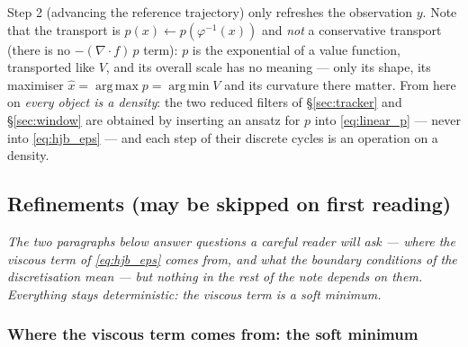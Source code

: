 \documentclass[11pt,a4paper]{article}
\newcommand{\argmin}{\operatorname{arg\,min}}
\newcommand{\argmax}{\operatorname{arg\,max}}
\newcommand{\xh}{\hat{x}}
\newcommand{\grad}{\nabla}
\theoremstyle{plain}
\theoremstyle{definition}
\theoremstyle{remark}
\begin{document}
Step 2 (advancing the reference trajectory) only refreshes the observation $y$. Note that the transport is $p(x)\leftarrow p(\varphi^{-1}(x))$ and \emph{not} a conservative transport (there is no $-(\grad\!\cdot\! f)\,p$ term): $p$ is the exponential of a value function, transported like $V$, and its overall scale has no meaning --- only its shape, its maximiser $\xh=\argmax p=\argmin V$ and its curvature there matter. From here on \emph{every object is a density}: the two reduced filters of \S\ref{sec:tracker} and \S\ref{sec:window} are obtained by inserting an ansatz for $p$ into \eqref{eq:linear_p} --- never into \eqref{eq:hjb_eps} --- and each step of their discrete cycles is an operation on a density.


\subsection{Refinements (may be skipped on first reading)}
\label{sec:refinements}

\emph{The two paragraphs below answer questions a careful reader will ask --- where the viscous term of \eqref{eq:hjb_eps} comes from, and what the boundary conditions of the discretisation mean --- but nothing in the rest of the note depends on them. Everything stays deterministic: the viscous term is a \emph{soft minimum}.}

\subsubsection{Where the viscous term comes from: the soft minimum}
\label{sec:softmin}
\end{document}
